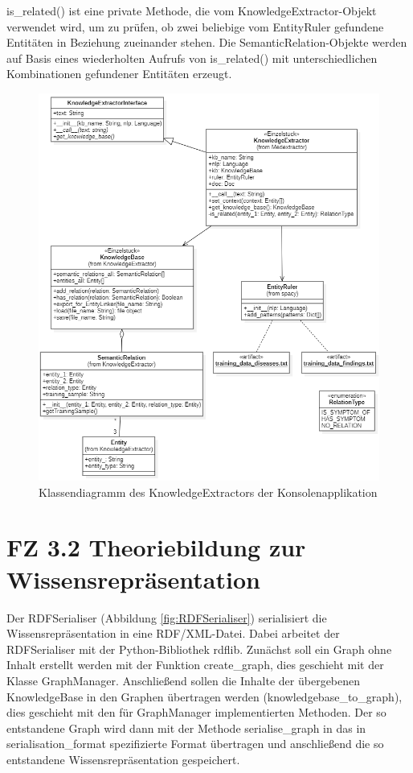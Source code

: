 is\_related() ist eine private Methode, die vom KnowledgeExtractor-Objekt verwendet wird, um zu prüfen, ob zwei beliebige vom EntityRuler gefundene Entitäten in Beziehung zueinander stehen. Die SemanticRelation-Objekte werden auf Basis eines wiederholten Aufrufs von is\_related() mit unterschiedlichen Kombinationen gefundener Entitäten erzeugt. 

\begin{figure}[h]
    \centering
    \includegraphics[width=\textwidth]{pictures/KnowledgeExtractor.png}
    \caption{Klassendiagramm des KnowledgeExtractors der Konsolenapplikation}
    \label{fig:KnowledgeExtractor}
\end{figure}

\section{FZ 3.2 Theoriebildung zur Wissensrepräsentation}
\label{sec:FZ3.2} 

Der RDFSerialiser (Abbildung \ref{fig:RDFSerialiser}) serialisiert die Wissensrepräsentation in eine RDF/XML-Datei.
Dabei arbeitet der RDFSerialiser mit der Python-Biblio\-thek rdflib. Zunächst soll ein Graph ohne Inhalt erstellt werden mit der Funktion create\_graph, dies geschieht mit der Klasse GraphManager. Anschließend sollen die Inhalte der übergebenen KnowledgeBase in den Graphen übertragen werden (knowledgebase\_to\_graph), dies geschieht mit den für GraphManager implementierten Methoden. Der so entstandene Graph wird dann mit der Methode serialise\_graph in das in serialisation\_format spezifizierte Format übertragen und anschließend die so entstandene Wissensrepräsentation gespeichert.

